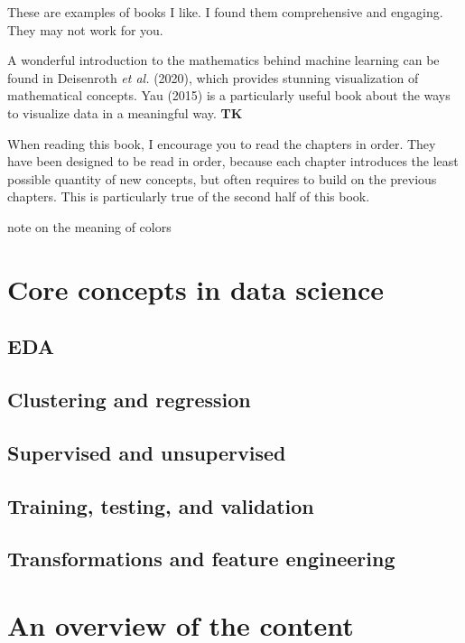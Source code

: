 \documentclass[
  letterpaper,
]{scrbook}
\begin{document}
These are examples of books I like. I found them comprehensive and
engaging. They may not work for you.

A wonderful introduction to the mathematics behind machine learning can
be found in Deisenroth \emph{et al.} (2020), which provides stunning
visualization of mathematical concepts. Yau (2015) is a particularly
useful book about the ways to visualize data in a meaningful way.
\textbf{TK}

When reading this book, I encourage you to read the chapters in order.
They have been designed to be read in order, because each chapter
introduces the least possible quantity of new concepts, but often
requires to build on the previous chapters. This is particularly true of
the second half of this book.

note on the meaning of colors

\section{Core concepts in data
science}\label{core-concepts-in-data-science}

\subsection{EDA}\label{eda}

\subsection{Clustering and regression}\label{clustering-and-regression}

\subsection{Supervised and
unsupervised}\label{supervised-and-unsupervised}

\subsection{Training, testing, and
validation}\label{training-testing-and-validation}

\subsection{Transformations and feature
engineering}\label{transformations-and-feature-engineering}

\section{An overview of the content}\label{an-overview-of-the-content}
\end{document}
